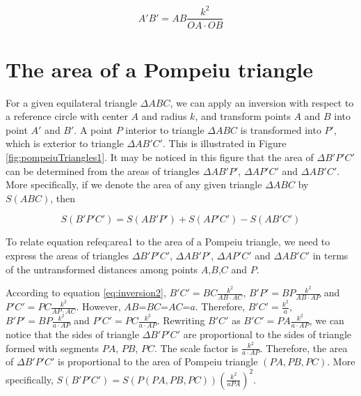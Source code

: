 \documentclass[12pt]{article}
\begin{document}
\begin{equation}
{A'B'}={AB}\frac{k^2}{OA\cdot OB}
\label{eq:inversion2}
\end{equation}

\section{The area of a Pompeiu triangle}

For a given equilateral triangle $\Delta ABC$, we can apply an inversion with respect to a reference circle with center $A$ and radius $k$, and transform points $A$ and $B$ into point $A'$ and $B'$. A point $P$ interior to triangle $\Delta ABC$ is transformed into $P'$, which is exterior to triangle $\Delta AB'C'$. This is illustrated in Figure \ref{fig:pompeiuTriangles1}. It may be noticed in this figure that the area of $\Delta B'P'C'$ can be determined from the areas of triangles $\Delta AB'P'$, $\Delta AP'C'$ and $\Delta AB'C'$.  More specifically, if we denote the area of any given triangle $\Delta ABC$ by $S(ABC)$, then

\begin{equation}
S(B'P'C')=S(AB'P')+S(AP'C')-S(AB'C')
\label{eq:area1}
\end{equation}

To relate equation ref{eq:area1} to the area of a Pompeiu triangle, we need to express the areas of triangles $\Delta B'P'C'$, $\Delta AB'P'$, $\Delta AP'C'$ and $\Delta AB'C'$ in terms of the untransformed distances among points $A$,$B$,$C$ and $P$.

According to equation \ref{eq:inversion2}, $B'C'=BC\frac{k^2}{AB\cdot AC}$, $B'P'=BP\frac{k^2}{AB\cdot AP}$ and $P'C'=PC\frac{k^2}{AP\cdot AC}$. 
However, $AB$=$BC$=$AC$=$a$. Therefore, $B'C'=\frac{k^2}{a}$, $B'P'=BP\frac{k^2}{a\cdot AP}$ and $P'C'=PC\frac{k^2}{a\cdot AP}$. Rewriting $B'C'$ as $B'C'=PA \frac{k^2}{a \cdot AP}$, we can notice that the sides of triangle $\Delta B'P'C'$ are proportional to the sides of triangle formed with segments $PA$, $PB$, $PC$. The scale factor is $\frac{k^2}{a \cdot AP}$. Therefore, the area of $\Delta B'P'C'$ is proportional to the area of Pompeiu triangle $(PA,PB,PC)$. More specifically, $S(B'P'C')=S(P(PA,PB,PC))(\frac{k^2}{a PA})^2$.
\end{document}

